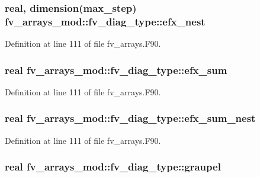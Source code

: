 \subsubsection[{efx\-\_\-nest}]{\setlength{\rightskip}{0pt plus 5cm}real, dimension({\bf max\-\_\-step}) fv\-\_\-arrays\-\_\-mod\-::fv\-\_\-diag\-\_\-type\-::efx\-\_\-nest}\label{structfv__arrays__mod_1_1fv__diag__type_af5695e644a6f2604bcb2cd502f534804}


Definition at line 111 of file fv\-\_\-arrays.\-F90.

\subsubsection[{efx\-\_\-sum}]{\setlength{\rightskip}{0pt plus 5cm}real fv\-\_\-arrays\-\_\-mod\-::fv\-\_\-diag\-\_\-type\-::efx\-\_\-sum}\label{structfv__arrays__mod_1_1fv__diag__type_ae15a07f9d6f051076e13dba74377e759}


Definition at line 111 of file fv\-\_\-arrays.\-F90.

\subsubsection[{efx\-\_\-sum\-\_\-nest}]{\setlength{\rightskip}{0pt plus 5cm}real fv\-\_\-arrays\-\_\-mod\-::fv\-\_\-diag\-\_\-type\-::efx\-\_\-sum\-\_\-nest}\label{structfv__arrays__mod_1_1fv__diag__type_a32a6f4014260bb3c0867fda0563f4c12}


Definition at line 111 of file fv\-\_\-arrays.\-F90.

\subsubsection[{graupel}]{\setlength{\rightskip}{0pt plus 5cm}real fv\-\_\-arrays\-\_\-mod\-::fv\-\_\-diag\-\_\-type\-::graupel}\label{structfv__arrays__mod_1_1fv__diag__type_a285a1994a61dfeb1cc4a2d41cb2daf58}


